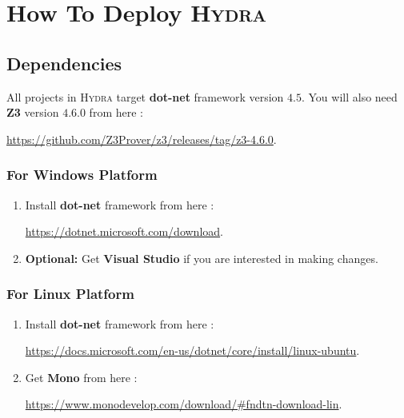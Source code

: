 \documentclass{article}
\begin{document}
\section{How To Deploy \textsc{Hydra}}
\subsection{Dependencies}
All projects in \textsc{Hydra} target \textbf{dot-net} framework version $4.5$. You will also need \textbf{Z3} version $4.6.0$ from here :
\par
\noindent
\url{https://github.com/Z3Prover/z3/releases/tag/z3-4.6.0}.
\subsubsection{For Windows Platform}
\begin{enumerate}
  \item Install \textbf{dot-net} framework from here :
  \par
  \noindent
 \url{https://dotnet.microsoft.com/download}.
  \item \textbf{Optional:} Get \textbf{Visual Studio} if you are interested in making changes.
\end{enumerate}
\subsubsection{For Linux Platform}
\begin{enumerate}
  \item Install \textbf{dot-net} framework from here :
  \par
  \noindent
  \url{https://docs.microsoft.com/en-us/dotnet/core/install/linux-ubuntu}.
  \item Get \textbf{Mono} from here :
  \par
  \noindent
   \url{https://www.monodevelop.com/download/#fndtn-download-lin}.
\end{enumerate}
\end{document}
